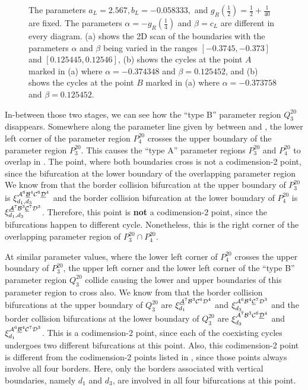 \begin{figure}
{		The parameters $a_L = 2.567, b_L = -0.058333,$ and $g_R\left(\frac{1}{2}\right) = \frac{1}{2} + \frac{1}{40}$ are fixed.
		The parameters $\alpha = -g_R\left(\frac{1}{4}\right)$ and $\beta = c_L$ are different in every diagram.
		(a) shows the 2D scan of the boundaries with the parameters $\alpha$ and $\beta$ being varied in the ranges $[-0.3745, -0.373]$ and $[0.125445, 0.12546]$,
		(b) shows the cycles at the point $A$ marked in (a) where $\alpha = -0.374348$ and $\beta = 0.125452$,
		and (b) shows the cycles at the point $B$ marked in (a) where $\alpha = -0.373758$ and $\beta = 0.125452$.
	}
\end{figure}

In-between those two stages, we can see how the ``type B'' parameter region $Q^{20}_3$ disappears.
Somewhere along the parameter line given by  between  and , the lower left corner of the parameter region $P^{20}_4$ crosses the upper boundary of the parameter region $P^{20}_3$.
This causes the ``type A'' parameter regions $P^{20}_3$ and $P^{20}_4$ to overlap in .
The point, where both boundaries cross is not a codimension-2 point, since the bifurcation at the lower boundary of the overlapping parameter region
We know from  that the border collision bifurcation at the upper boundary of $P^{20}_3$ is $\xi_{d_1, d_3}^{\mathcal{A}^6\underline{\mathcal{B}}^4\mathcal{C}^6\underline{\mathcal{D}}^4}$ and the border collision bifurcation at the lower boundary of $P^{20}_4$ is $\xi_{d_1, d_3}^{\underline{\mathcal{A}}^7\mathcal{B}^3\underline{\mathcal{C}}^7\mathcal{D}^3}$.
Therefore, this point is \textbf{not} a codimension-2 point, since the bifurcations happen to different cycle.
Nonetheless, this is the right corner of the overlapping parameter region of $P^{20}_3 \cap P^{20}_4$.

At similar parameter values, where the lower left corner of $P^{20}_4$ crosses the upper boundary of $P^{20}_3$, the upper left corner and the lower left corner of the ``type B'' parameter region $Q^{20}_3$ collide causing the lower and upper boundaries of this parameter region to cross also.
We know from  that the border collision bifurcations at the upper boundary of $Q^{20}_3$ are $\xi_{d_1}^{\underline{\mathcal{A}}^7\mathcal{B}^3\mathcal{C}^6\mathcal{D}^4}$ and $\xi_{d_3}^{\mathcal{A}^6\mathcal{B}^4\underline{\mathcal{C}}^7\mathcal{D}^3}$ and the border collision bifurcations at the lower boundary of $Q^{20}_3$ are $\xi_{d_3}^{\mathcal{A}^7\mathcal{B}^3\mathcal{C}^6\underline{\mathcal{D}}^4}$ and $\xi_{d_1}^{\mathcal{A}^6\underline{\mathcal{B}}^4\mathcal{C}^7\mathcal{D}^3}$.
This is a codimension-2 point, since each of the coexisting cycles undergoes two different bifurcations at this point.
Also, this codimension-2 point is different from the codimension-2 points listed in , since those points always involve all four borders.
Here, only the borders associated with vertical boundaries, namely $d_1$ and $d_3$, are involved in all four bifurcations at this point.

